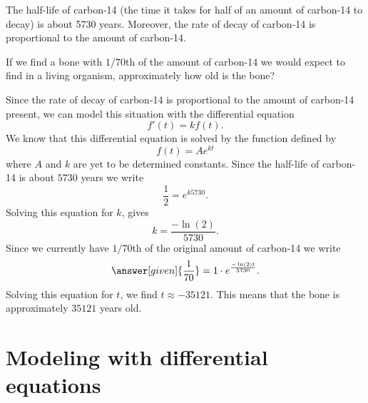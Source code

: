 \documentclass{ximera}
\begin{document}
\begin{example}
The half-life of carbon-14 (the time it takes for half of an amount of
carbon-14 to decay) is about 5730 years. Moreover, the rate of decay
of carbon-14 is proportional to the amount of carbon-14.

If we find a bone with $1/70$th of the amount of carbon-14 we would
expect to find in a living organism, approximately how old is the
bone?

\begin{explanation}
Since the rate of decay of carbon-14 is proportional to the amount of
carbon-14 present, we can model this situation with the differential
equation
\[
f'(t) = k f(t).
\]
We know that this differential equation is solved by the function
defined by
\[
f(t) = A e^{kt}
\]
where $A$ and $k$ are yet to be determined constants. Since the
half-life of carbon-14 is about $5730$ years we write
\[
\frac{1}{2} = e^{k 5730}.
\]
Solving this equation for $k$, gives
\[
k = \frac{-\ln(2)}{5730}.
\]
Since we currently have $1/70$th of the original amount of carbon-14
we write
\[
\answer[given]{\frac{1}{70}} = 1\cdot e^{\frac{-\ln(2)t}{5730}}.
\]
Solving this equation for $t$, we find $t \approx -35121$. This means
that the bone is approximately $35121$ years old.
\end{explanation}
\end{example}



\section{Modeling with differential equations}
\end{document}
